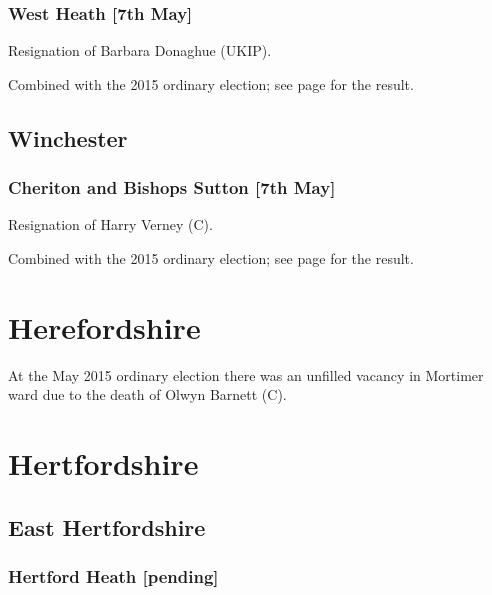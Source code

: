 \documentclass[a4paper,openany]{book}
\begin{document}
\begin{resultsiii}
\subsubsection*{West Heath \hspace*{\fill}\nolinebreak[1]%
\enspace\hspace*{\fill}
[7th May]}


Resignation of Barbara Donaghue (UKIP).

Combined with the 2015 ordinary election; see page \pageref{WestHeathRushmoor} for the result.

\subsection*{Winchester}

\subsubsection*{Cheriton and Bishops Sutton \hspace*{\fill}\nolinebreak[1]%
\enspace\hspace*{\fill}
[7th May]}


Resignation of Harry Verney (C).

Combined with the 2015 ordinary election; see page \pageref{CheritonBishopsSuttonWinchester} for the result.

\section{Herefordshire}

\noindent
At the May 2015 ordinary election there was an unfilled vacancy in Mortimer ward due to the death of Olwyn Barnett (C).

\section{Hertfordshire}

\subsection*{East Hertfordshire}

\subsubsection*{Hertford Heath \hspace*{\fill}\nolinebreak[1]%
\enspace\hspace*{\fill}
[pending]}


\end{resultsiii}
\end{document}
